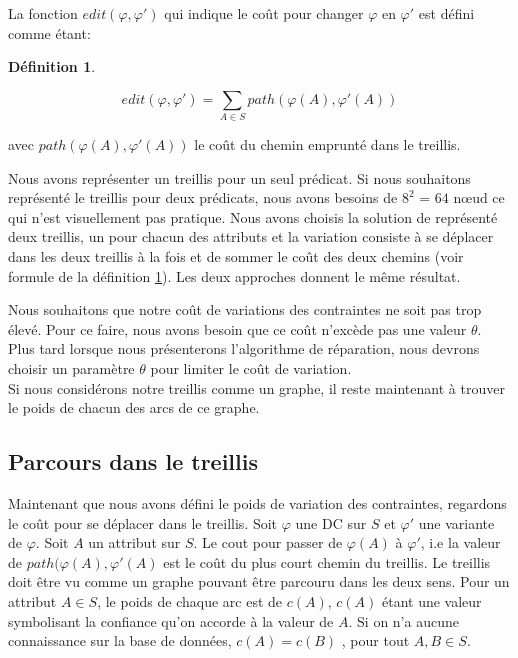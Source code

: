 \documentclass[letterpaper, 12pt]{report}
\theoremstyle{definition}
\newtheorem{mydef}{Définition}
\begin{document}
La fonction $edit(\varphi , \varphi ')$ qui indique le coût pour changer $\varphi$ en $\varphi'$ est défini comme étant:

\begin{mydef} \label{edit}

$$
 edit(\varphi, \varphi') = \sum_{A \in S} path(\varphi(A),\varphi'(A))$$
 
avec $path(\varphi(A),\varphi'(A))$ le coût du chemin emprunté dans le treillis.
\end{mydef}

Nous avons représenter un treillis pour un seul prédicat. Si nous souhaitons représenté le treillis pour deux prédicats, nous avons besoins de $8^2$ = $64$ nœud ce qui n'est visuellement pas pratique. Nous avons choisis la solution de représenté deux treillis, un pour chacun des attributs et la variation consiste à se déplacer dans les deux treillis à la fois et de sommer le coût des deux chemins (voir formule de la définition \ref{edit}). Les deux approches donnent le même résultat.

Nous souhaitons que notre coût de variations des contraintes ne soit pas trop élevé. Pour ce faire, nous avons besoin que ce coût n'excède pas une valeur $\theta$. Plus tard lorsque nous présenterons l'algorithme de réparation, nous devrons choisir un paramètre $\theta$ pour limiter le coût de variation.\\

Si nous considérons notre treillis comme un graphe, il reste maintenant à trouver le poids de chacun des arcs de ce graphe. 

\subsection{Parcours dans le treillis}

	Maintenant que nous avons défini le poids de variation des contraintes, regardons le coût pour se déplacer dans le treillis. Soit $\varphi$ une DC sur $S$ et $\varphi'$ une variante de $\varphi$. Soit $A$ un attribut sur $S$. Le cout pour passer de $\varphi(A)$ à $\varphi'$, i.e la valeur de $path(\varphi(A),\varphi'(A)$ est le coût du plus court chemin du treillis. Le treillis doit être vu comme un graphe pouvant être parcouru dans les deux sens. Pour un attribut $A\in S$, le poids de chaque arc est de $c(A)$, $c(A)$ étant une valeur symbolisant la confiance qu'on accorde à la valeur de $A$. Si on n'a aucune connaissance sur la base de données, $c(A) =c(B)$ , pour tout $A,B \in S$.
	
\end{document}
